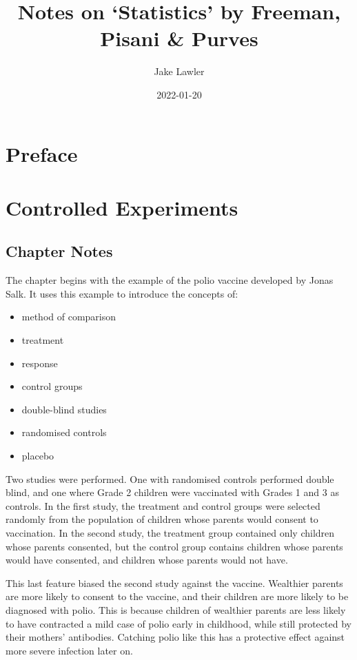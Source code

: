 \documentclass[
]{book}
\title{Notes on `Statistics' by Freeman, Pisani \& Purves}
\author{Jake Lawler}
\date{2022-01-20}
\providecommand{\tightlist}{%
  \setlength{\itemsep}{0pt}\setlength{\parskip}{0pt}}
\begin{document}
\maketitle

{
\setcounter{tocdepth}{1}
\tableofcontents
}
\hypertarget{preface}{%
\chapter*{Preface}\label{preface}}

\hypertarget{experiments}{%
\chapter{Controlled Experiments}\label{experiments}}

\hypertarget{chapter-notes}{%
\section{Chapter Notes}\label{chapter-notes}}

The chapter begins with the example of the polio vaccine developed by Jonas Salk. It uses this example to introduce the concepts of:

\begin{itemize}
\tightlist
\item
  method of comparison
\item
  treatment
\item
  response
\item
  control groups
\item
  double-blind studies
\item
  randomised controls
\item
  placebo
\end{itemize}

Two studies were performed. One with randomised controls performed double blind, and one where Grade 2 children were vaccinated with Grades 1 and 3 as controls. In the first study, the treatment and control groups were selected randomly from the population of children whose parents would consent to vaccination. In the second study, the treatment group contained only children whose parents consented, but the control group contains children whose parents would have consented, and children whose parents would not have.

This last feature biased the second study against the vaccine. Wealthier parents are more likely to consent to the vaccine, and their children are more likely to be diagnosed with polio. This is because children of wealthier parents are less likely to have contracted a mild case of polio early in childhood, while still protected by their mothers' antibodies. Catching polio like this has a protective effect against more severe infection later on.
\end{document}
